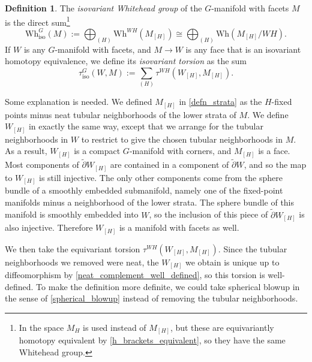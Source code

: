 \documentclass[11pt]{amsart}
\theoremstyle{definition}
\newtheorem{defn}{Definition}[section]
\numberwithin{equation}{section}
\numberwithin{figure}{section}
\newcommand{\ti}{\widetilde}
\newcommand{\iso}{\mathrm{iso}}
\newcommand{\Wh}{\mathrm{Wh}}
\begin{document}

\begin{defn}

		 The \emph{isovariant Whitehead group} of the $G$-manifold with facets $M$ is the direct sum\footnote{In \cite{luck} the space $M_H$ is used instead of $M_{[H]}$, but these are equivariantly homotopy equivalent by \autoref{h_brackets_equivalent}, so they have the same Whitehead group.}
		\[ \Wh^G_{\iso}(M) := \bigoplus_{(H)} \Wh^{WH}(M_{[H]}) \cong \bigoplus_{(H)} \Wh(M_{[H]}/WH). \] %
		 If $W$ is any $G$-manifold with facets, and $M \to W$ is any face that is an isovariant homotopy equivalence, we define its \emph{isovariant torsion} as the sum
		\[ \tau^G_{\iso}(W,M) := \sum_{(H)} \tau^{WH}(W_{[H]},M_{[H]}). \]

\end{defn}

Some explanation is needed. We defined $M_{[H]}$ in \autoref{defn_strata} as the $H$-fixed points minus neat tubular neighborhoods of the lower strata of $M$. We define $W_{[H]}$ in exactly the same way, except that we arrange for the tubular neighborhoods in $W$ to restrict to give the chosen tubular neighborhoods in $M$. As a result, $W_{[H]}$ is a compact $G$-manifold with corners, and $M_{[H]}$ is a face. Most components of $\ti\partial W_{[H]}$ are contained in a component of $\ti\partial W$, and so the map to $W_{[H]}$ is still injective. The only other components come from the sphere bundle of a smoothly embedded submanifold, namely one of the fixed-point manifolds minus a neighborhood of the lower strata. The sphere bundle of this manifold is smoothly embedded into $W$, so the inclusion of this piece of $\ti\partial W_{[H]}$ is also injective. Therefore $W_{[H]}$ is a manifold with facets as well.

We then take the equivariant torsion $\tau^{WH}(W_{[H]},M_{[H]})$. Since the tubular neighborhoods we removed were neat, the $W_{[H]}$ we obtain is unique up to diffeomorphism by \autoref{neat_complement_well_defined}, so this torsion is well-defined. To make the definition more definite, we could take spherical blowup in the sense of \autoref{spherical_blowup} instead of removing the tubular neighborhoods.
\end{document}
